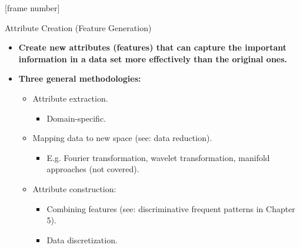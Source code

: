 \documentclass[aspectratio=169,t]{beamer}
\begin{document}
  {
    [frame number]
    \begin{frame}{Attribute Creation (Feature Generation)}
    \begin{itemize}
      \item \textbf{Create new attributes (features) that can capture the important information in a data set more effectively than the original ones.}
      \item \textbf{Three general methodologies:}
      \begin{itemize}
        \item Attribute extraction.
        \begin{itemize}
          \item Domain-specific.
        \end{itemize}
      \item Mapping data to new space (see: data reduction).
      \begin{itemize}
        \item E.g. Fourier transformation, wavelet transformation, manifold approaches (not covered).
      \end{itemize}
      \item Attribute construction:
      \begin{itemize}
        \item Combining features (see: discriminative frequent patterns in Chapter 5).
        \item Data discretization.
      \end{itemize}
     \end{itemize}
    \end{itemize}
    \end{frame}
  }
\end{document}
